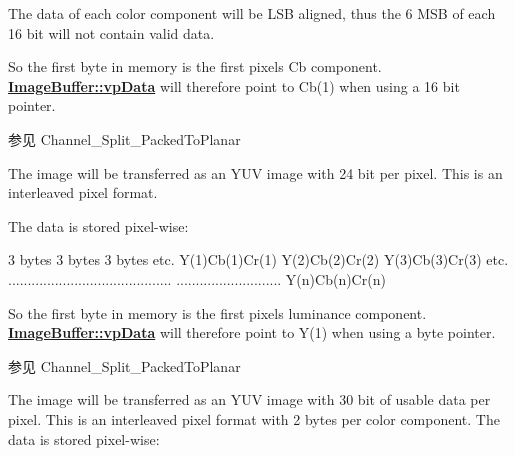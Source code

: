 \begin{Desc}
\begin{description}
The data of each color component will be L\+S\+B aligned, thus the 6 M\+S\+B of each 16 bit will not contain valid data.

So the first byte in memory is the first pixels Cb component. {\bfseries \hyperlink{struct_image_buffer_ab67c9c21d749e786302c848b508e0673}{Image\+Buffer\+::vp\+Data}} will therefore point to Cb(1) when using a 16 bit pointer.

\begin{DoxySeeAlso}{参见}
Channel\+\_\+\+Split\+\_\+\+Packed\+To\+Planar 
\end{DoxySeeAlso}
\item[{\em 
\hypertarget{group___common_interface_gga456e8aa76e06bb761f27c52141475985a40b9272ee2a2acc8576eb7e1b0e087f7}{ibpf\+Y\+U\+V444\+Packed}\label{group___common_interface_gga456e8aa76e06bb761f27c52141475985a40b9272ee2a2acc8576eb7e1b0e087f7}
}]The image will be transferred as an Y\+U\+V image with 24 bit per pixel. This is an interleaved pixel format.

The data is stored pixel-\/wise\+:


\begin{DoxyCode}
3 bytes        3 bytes        3 bytes      etc.
Y(1)Cb(1)Cr(1) Y(2)Cb(2)Cr(2) Y(3)Cb(3)Cr(3) etc.
..........................................
...........................   Y(n)Cb(n)Cr(n)
\end{DoxyCode}


So the first byte in memory is the first pixels luminance component. {\bfseries \hyperlink{struct_image_buffer_ab67c9c21d749e786302c848b508e0673}{Image\+Buffer\+::vp\+Data}} will therefore point to Y(1) when using a byte pointer.

\begin{DoxySeeAlso}{参见}
Channel\+\_\+\+Split\+\_\+\+Packed\+To\+Planar 
\end{DoxySeeAlso}
\item[{\em 
\hypertarget{group___common_interface_gga456e8aa76e06bb761f27c52141475985a39bda35000ea73c29480b284acba29ba}{ibpf\+Y\+U\+V444\+\_\+10\+Packed}\label{group___common_interface_gga456e8aa76e06bb761f27c52141475985a39bda35000ea73c29480b284acba29ba}
}]The image will be transferred as an Y\+U\+V image with 30 bit of usable data per pixel. This is an interleaved pixel format with 2 bytes per color component. The data is stored pixel-\/wise\+:



\end{description}
\end{Desc}
